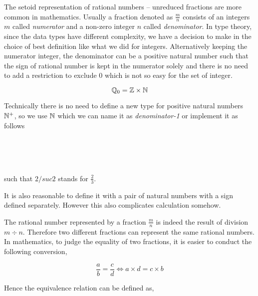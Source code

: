 The setoid representation of rational numbers -- unreduced fractions
are more common in mathematics.
Usually a fraction denoted as $\frac{m}{n}$ consists of an integers
$m$ called \emph{numerator} and a non-zero integer $n$ called
\emph{denominator}.
In type theory, since the data types have different
complexity, we have a decision to make in the choice of best
definition like what we did for integers.
Alternatively keeping the numerator integer, the denominator can be a
positive natural number such that the sign of rational number is kept
in the numerator solely and there is no need to add a restriction to
exclude $0$ which is not so easy for the set of integer.

$$\mathbb{Q}_0 = \mathbb{Z} \times \mathbb{N}$$

Technically there is no need to define a new type for positive
natural numbers $\mathbb{N}^{+}$, so we use $\mathbb{N}$ which we can name it as
\emph{denominator-1} or implement it as follows

\begin{code}
\\
\>  \AgdaSymbol{:}  \<%
\\
\>[-1]\<[2]%
\>[2] \AgdaSymbol{:} \AgdaSymbol{(} \AgdaSymbol{:} \AgdaSymbol{)}  \AgdaSymbol{(} \AgdaSymbol{:} \AgdaSymbol{)}  \<%
\\
\end{code}

such that $2 /suc 2$ stands for $\frac{2}{3}$.


\begin{remark}
It is also reasonable to define it with a pair of natural numbers with
a sign defined separately. However this also complicates calculation somehow.
\end{remark}



The rational number represented by a fraction $\frac{m}{n}$ is indeed the result of
division $m \div n$. Therefore two different fractions can represent
the same rational numbers.
In mathematics, to judge the equality of two fractions, it is easier to conduct the following conversion,

$$ \frac{a}{b} = \frac{c}{d} \iff a \times d = c \times b $$


Hence the equivalence relation can be defined as,

